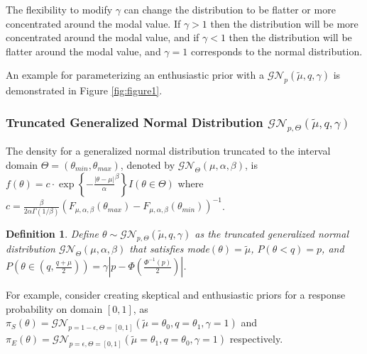 \documentclass[12pt]{article}
\newtheorem{mydef}{Definition}
\begin{document}
The flexibility to modify $\gamma$ can change the distribution to be flatter or more concentrated around the modal value. If $\gamma>1$ then the distribution will be more concentrated around the modal value, and if $\gamma<1$ then the distribution will be flatter around the modal value, and $\gamma=1$ corresponds to the normal distribution.

An example for parameterizing an enthusiastic prior with a $\mathcal{GN}_p(\tilde{\mu},q,\gamma)$ is demonstrated in Figure \ref{fig:figure1}.

\subsubsection{Truncated Generalized Normal Distribution $\mathcal{GN}_{p,\Theta}(\tilde{\mu},q,\gamma)$}
The density for a generalized normal distribution truncated to the interval domain $\Theta=(\theta_{min},\theta_{max})$, denoted by $\mathcal{GN}_\Theta(\mu,\alpha,\beta)$, is $f(\theta)=c\cdot\exp\left\{-\frac{|\theta-\mu|}{\alpha}^{\beta}\right\}{I(\theta\in \Theta)}$ where $c=\frac{\beta}{2\alpha \Gamma(1/\beta)}({F_{\mu,\alpha,\beta}(\theta_{max})-F_{\mu,\alpha,\beta}(\theta_{min})})^{-1}$. 

\begin{mydef}\label{def:gennormaltruncated}
Define $\theta\sim\mathcal{GN}_{p,\Theta}(\tilde{\mu},q,\gamma)$ as the truncated generalized normal distribution $\mathcal{GN}_\Theta(\mu,\alpha,\beta)$ that satisfies mode$(\theta)=\tilde{\mu}$, $P(\theta<q)=p$, and $P(\theta\in(q,\frac{q+\mu}{2}))=\gamma|p-\Phi(\frac{\Phi^{-1}(p)}{2})|$.
\end{mydef}

For example, consider creating skeptical and enthusiastic priors for a response probability on domain $[0,1]$, as $
\pi_S(\theta)=\mathcal{GN}_{p=1-\epsilon,\Theta=[0,1]}(\tilde{\mu}=\theta_0,q=\theta_1,\gamma=1)$ and $
\pi_E(\theta)=\mathcal{GN}_{p=\epsilon,\Theta=[0,1]}(\tilde{\mu}=\theta_1,q=\theta_0,\gamma=1)$ respectively.
\end{document}
